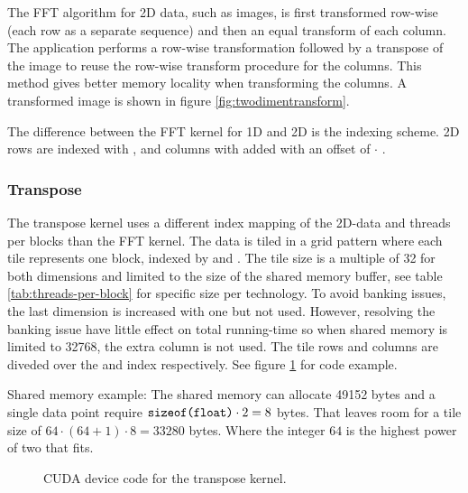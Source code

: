The \gls{FFT} algorithm for \gls{2D} data, such as images, is first transformed row-wise (each row as a separate sequence) and then an equal transform of each column. The application performs a row-wise transformation followed by a transpose of the image to reuse the row-wise transform procedure for the columns. This method gives better memory locality when transforming the columns. A transformed image is shown in figure \ref{fig:twodimentransform}.

The difference between the \gls{FFT} kernel for \gls{1D} and \gls{2D} is the indexing scheme. \gls{2D} rows are indexed with , and columns with  added with an offset of  $\cdot$ .

\subsubsection{Transpose}

The transpose kernel uses a different index mapping of the 2D-data and threads per blocks than the \gls{FFT} kernel. The data is tiled in a grid pattern where each tile represents one block, indexed by  and . The tile size is a multiple of 32 for both dimensions and limited to the size of the shared memory buffer, see table \ref{tab:threads-per-block} for specific size per technology. To avoid banking issues, the last dimension is increased with one but not used. However, resolving the banking issue have little effect on total running-time so when shared memory is limited to 32768, the extra column is not used. The tile rows and columns are diveded over the  and  index respectively. See figure \ref{lst:cuda:device-transpose} for code example.

Shared memory example: The {\CU} shared memory can allocate 49152 bytes and a single data point require $\texttt{sizeof(float)} \cdot 2 = 8$ bytes. That leaves room for a tile size of $64 \cdot (64 + 1) \cdot 8 = 33280$ bytes. Where the integer $64$ is the highest power of two that fits.

\begin{figure}
	\centering
	\begin{framed}
			
	\end{framed}
	\caption{CUDA device code for the transpose kernel.}
	\label{lst:cuda:device-transpose}	
\end{figure}

